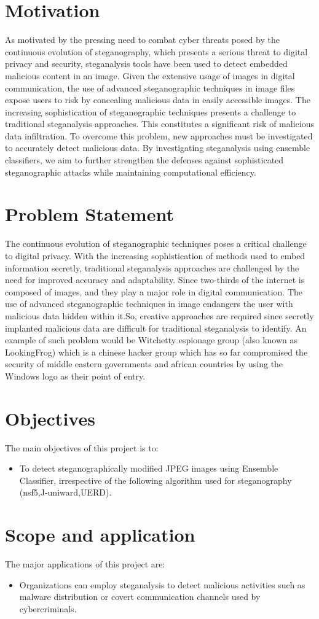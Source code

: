 \section{Motivation}
As motivated by the pressing need to combat cyber threats posed by the continuous evolution of steganography, which presents a serious threat to digital privacy and security, steganalysis tools have been used to detect embedded malicious content in an image. Given the extensive usage of images in digital communication, the use of advanced steganographic techniques in image files expose users to risk by concealing malicious data in easily accessible images. The increasing sophistication of steganographic techniques presents a challenge to traditional steganalysis approaches. This constitutes a significant risk of malicious data infiltration. To overcome this problem, new approaches must be investigated to accurately detect malicious data. By investigating steganalysis using ensemble classifiers, we aim to further strengthen the defenses against sophisticated steganographic attacks while maintaining computational efficiency.\\

\section{Problem Statement} 
The continuous evolution of steganographic techniques poses a critical challenge to digital privacy. With the increasing sophistication of methods used to embed information secretly, traditional steganalysis approaches are challenged by the need for improved accuracy and adaptability. Since two-thirds of the internet is composed of images, and they play a major role in digital communication. The use of advanced steganographic techniques in image endangers the user with malicious data hidden within it.So, creative approaches are required since secretly implanted malicious data are difficult for traditional steganalysis to identify. An example of such problem would be Witchetty espionage group (also known as LookingFrog) which is a chinese hacker group which has so far compromised the security of middle eastern governments and african countries by using the Windows logo as their point of entry.\\
\clearpage

\section{Objectives}
The main objectives of this project is to:
\begin{itemize}
\item  To detect steganographically modified JPEG images using Ensemble \mbox{Classifier}, irrespective of the following algorithm used for steganography (nsf5,J-uniward,UERD). 
\end{itemize}
\section{Scope and application}
The major applications of this project are:
\begin{itemize}
    \item Organizations can employ steganalysis to detect malicious activities such as malware distribution or covert communication channels used by cybercriminals.
\end{itemize}

